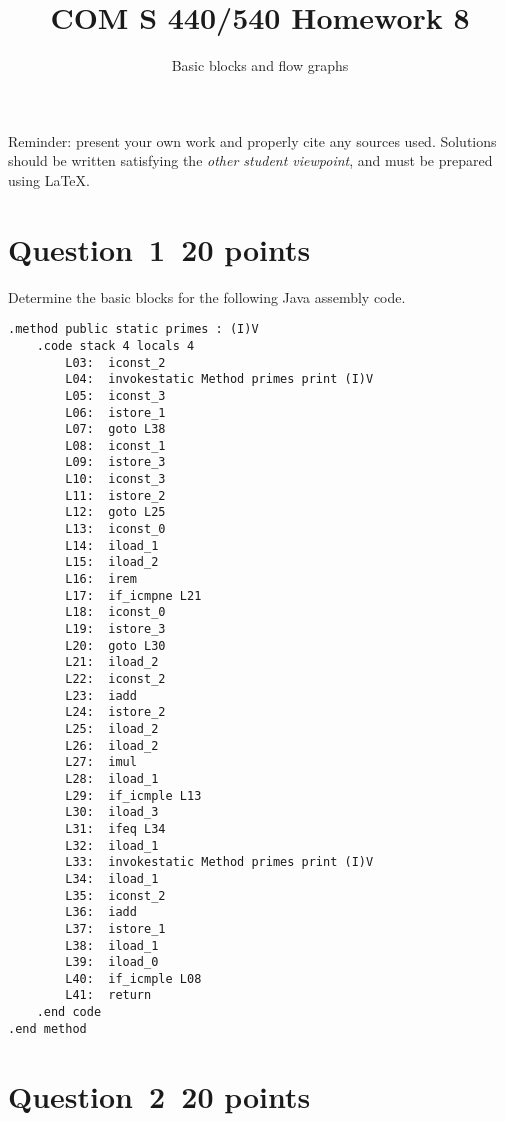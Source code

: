 \documentclass[10pt]{article}
\title{COM S 440/540 Homework 8}
\date{}
\author{Basic blocks and flow graphs}
\renewcommand{\thepage}{~}
\begin{document}
\maketitle

\noindent
Reminder: present your own work and properly cite any sources used.
Solutions should be written satisfying the \emph{other student viewpoint},
and must be prepared using \LaTeX.
\renewcommand{\thepage}{~}
\section*{Question~1~\hfill 20 points}
Determine the basic blocks for the following Java assembly code.
\begin{lstlisting}[style=jvm,numbers=none]
.method public static primes : (I)V
    .code stack 4 locals 4
        L03:  iconst_2
        L04:  invokestatic Method primes print (I)V
        L05:  iconst_3
        L06:  istore_1
        L07:  goto L38
        L08:  iconst_1
        L09:  istore_3
        L10:  iconst_3
        L11:  istore_2
        L12:  goto L25
        L13:  iconst_0
        L14:  iload_1
        L15:  iload_2
        L16:  irem
        L17:  if_icmpne L21
        L18:  iconst_0
        L19:  istore_3
        L20:  goto L30
        L21:  iload_2
        L22:  iconst_2
        L23:  iadd
        L24:  istore_2
        L25:  iload_2
        L26:  iload_2
        L27:  imul
        L28:  iload_1
        L29:  if_icmple L13
        L30:  iload_3
        L31:  ifeq L34
        L32:  iload_1
        L33:  invokestatic Method primes print (I)V
        L34:  iload_1
        L35:  iconst_2
        L36:  iadd
        L37:  istore_1
        L38:  iload_1
        L39:  iload_0
        L40:  if_icmple L08
        L41:  return
    .end code
.end method
\end{lstlisting}


\section*{Question~2~\hfill 20 points}
\end{document}

